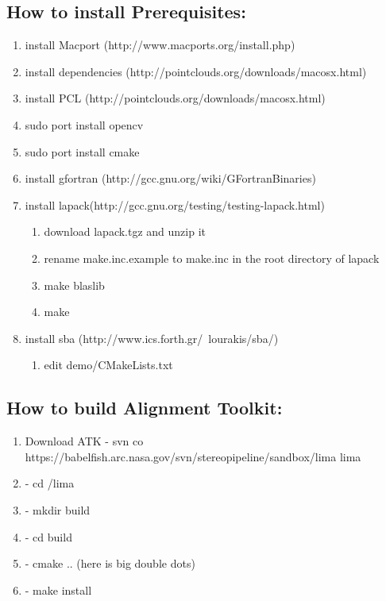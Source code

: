 \documentclass[12pt]{article}
\begin{document}
\subsection{How to install Prerequisites:}
\begin{enumerate}
	\item{} install Macport (http://www.macports.org/install.php) 
	\item{} install dependencies (http://pointclouds.org/downloads/macosx.html)
	\item{} install PCL (http://pointclouds.org/downloads/macosx.html)
	\item{} sudo port install opencv
	\item{} sudo port install cmake
	\item{} install gfortran (http://gcc.gnu.org/wiki/GFortranBinaries)
	\item{} install lapack(http://gcc.gnu.org/testing/testing-lapack.html)
	\begin{enumerate}
		\item{} download lapack.tgz and unzip it
		\item{} rename make.inc.example to make.inc in the root directory of lapack 
		\item{} make blaslib
		\item{} make
	\end{enumerate}
	\item{} install sba (http://www.ics.forth.gr/~lourakis/sba/) 
	\begin{enumerate}
		\item{} edit demo/CMakeLists.txt
	\end{enumerate}
\end{enumerate}

\subsection{How to build Alignment Toolkit:}
\begin{enumerate}
	\item{Download ATK} - svn co  https://babelfish.arc.nasa.gov/svn/stereopipeline/sandbox/lima lima
	\item{} - cd /lima 
	\item{} - mkdir build 
	\item{} - cd build 
	\item{} - cmake .. (here is big double dots)
	\item{} - make install
\end{enumerate}
\end{document}
